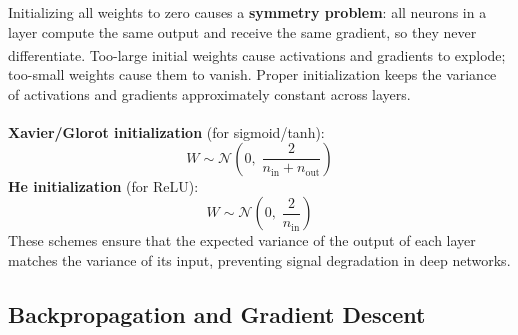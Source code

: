 \begin{tcbitemize}[ skin=sectionraster ]
    \tcbitem[title={Why Initialization Matters}, raster multicolumn=3]
    Initializing all weights to zero causes a \textbf{symmetry problem}: all neurons in a layer compute the same output and receive the same gradient, so they never differentiate\textsuperscript{\cite[][pp.~8--10]{robertsPrinciplesDeepLearning2022}}.
    Too-large initial weights cause activations and gradients to explode; too-small weights cause them to vanish.
    Proper initialization keeps the variance of activations and gradients approximately constant across layers.

    \tcbitem[title={Xavier and He Initialization}, raster multicolumn=3]
    \textbf{Xavier/Glorot initialization}\textsuperscript{\cite[][]{glorotUnderstandingDifficultyTraining}} (for sigmoid/tanh):
    \begin{equation}
        W \sim \mathcal{N}\!\left(0,\; \frac{2}{n_{\mathrm{in}} + n_{\mathrm{out}}}\right)
    \end{equation}
    \textbf{He initialization} (for ReLU):
    \begin{equation}
        W \sim \mathcal{N}\!\left(0,\; \frac{2}{n_{\mathrm{in}}}\right)
    \end{equation}
    These schemes ensure that the expected variance of the output of each layer matches the variance of its input, preventing signal degradation in deep networks.
\end{tcbitemize}

\subsection{Backpropagation and Gradient Descent}

